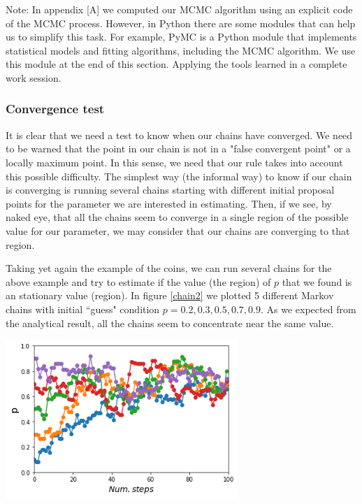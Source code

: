 \documentclass[onecolumn,           %
               showpacs,            %
               preprintnumbers,     %
               aps,                 %
               prl,          	    %
               letterpaper,             %
               superscriptaddress,      %
               nofootinbib,         %
               tightenlines,        %
               floats,floatfix      %
               ,usenatbib,
               ]{revtex4-1}
\begin{document}
Note: In appendix [A] we computed our MCMC algorithm using an explicit code of the MCMC process. However, in Python there are some modules that can help us to simplify this task. For example, PyMC is a Python module that implements statistical models and fitting algorithms, including the MCMC algorithm. We use this module at the end of this section. Applying the tools learned in a complete work session.

\subsubsection{Convergence test} 
It is clear that we need a test to know when our chains have converged. We need to be warned that the point in our chain is not in a "false convergent point" or a locally maximum point. In this sense, we need that our rule takes into account this possible difficulty. The simplest way (the informal way) to know if our chain is converging is running several chains starting with different initial proposal points for the parameter we are interested in estimating. Then, if we see, by naked eye, that all the chains seem to converge in a single region of the possible value for our parameter, we may consider that our chains are converging to that region. 

 Taking yet again the example of the coins, we can run several chains for the above example and try to estimate if the value (the region) of $p$ that we found is an stationary value (region). In figure \ref{chain2} we plotted 5 different Markov chains with initial ``guess" condition $p=0.2,0.3,0.5,0.7,0.9$. As we expected from the analytical result, all the chains seem to concentrate near the same value.

\begin{minipage}{\textwidth}
\centering
\includegraphics[height=6cm]{Figures/chain22.png}
\label{chain2}
\end{minipage}
\end{document}
